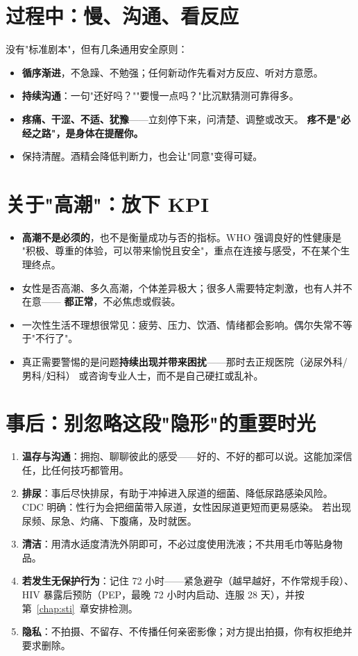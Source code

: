 \section{过程中：慢、沟通、看反应}

没有"标准剧本"，但有几条通用安全原则：

\begin{itemize}[leftmargin=2em]
  \item \textbf{循序渐进}，不急躁、不勉强；任何新动作先看对方反应、听对方意愿。
  \item \textbf{持续沟通}：一句"还好吗？""要慢一点吗？"比沉默猜测可靠得多。
  \item \textbf{疼痛、干涩、不适、犹豫}——立刻停下来，问清楚、调整或改天。
        \textbf{疼不是"必经之路"，是身体在提醒你。}
  \item 保持清醒。酒精会降低判断力，也会让"同意"变得可疑。
\end{itemize}

\section{关于"高潮"：放下 KPI}

\begin{itemize}[leftmargin=2em]
  \item \textbf{高潮不是必须的}，也不是衡量成功与否的指标。WHO 强调良好的性健康是
        "积极、尊重的体验，可以带来愉悦且安全"，重点在连接与感受，不在某个生理终点。
  \item 女性是否高潮、多久高潮，个体差异极大；很多人需要特定刺激，也有人并不在意——
        \textbf{都正常}，不必焦虑或假装。
  \item 一次性生活不理想很常见：疲劳、压力、饮酒、情绪都会影响。偶尔失常不等于"不行了"。
  \item 真正需要警惕的是问题\textbf{持续出现并带来困扰}——那时去正规医院（泌尿外科/男科/妇科）
        或咨询专业人士，而不是自己硬扛或乱补。
\end{itemize}

\section{事后：别忽略这段"隐形"的重要时光}

\begin{enumerate}[leftmargin=2em,itemsep=0.3em]
  \item \textbf{温存与沟通}：拥抱、聊聊彼此的感受——好的、不好的都可以说。这能加深信任，比任何技巧都管用。
  \item \textbf{排尿}：事后尽快排尿，有助于冲掉进入尿道的细菌、降低尿路感染风险。
        CDC 明确：性行为会把细菌带入尿道，女性因尿道更短而更易感染。
        若出现尿频、尿急、灼痛、下腹痛，及时就医。
  \item \textbf{清洁}：用清水适度清洗外阴即可，不必过度使用洗液；不共用毛巾等贴身物品。
  \item \textbf{若发生无保护行为}：记住 72 小时——紧急避孕（越早越好，不作常规手段）、
        HIV 暴露后预防（PEP，最晚 72 小时内启动、连服 28 天），并按第~\ref{chap:sti}~章安排检测。
  \item \textbf{隐私}：不拍摄、不留存、不传播任何亲密影像；对方提出拍摄，你有权拒绝并要求删除。
\end{enumerate}

